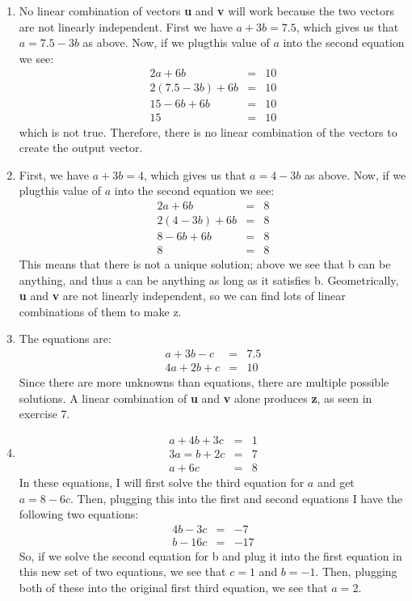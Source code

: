 \documentclass{article}
\begin{document}
\begin{enumerate}
	\item No linear combination of vectors \textbf{u} and \textbf{v} will work because the two vectors are not linearly independent. First we have $a +3b =7.5$, which gives us that $a = 7.5-3b$ as above. Now, if we plugthis value of $a$ into the second equation we see:
	\begin{eqnarray*}
		2a+6b&=&10\\
		2(7.5-3b)+6b &=&10\\
		15-6b+6b &=& 10\\
		15 &=& 10
	\end{eqnarray*}
	which is not true. Therefore, there is no linear combination of the vectors to create the output vector. 
	
	\item First, we have $a +3b =4$, which gives us that $a = 4-3b$ as above. Now, if we plugthis value of $a$ into the second equation we see:
	\begin{eqnarray*}
		2a+6b&=&8\\
		2(4-3b) + 6b &=& 8\\
		8-6b+6b &=& 8\\
		8&=&8
	\end{eqnarray*}
	This means that there is not a unique solution; above we see that b can be anything, and thus a can be anything as long as it satisfies b. Geometrically, \textbf{u} and \textbf{v} are not linearly independent, so we can find lots of linear combinations of them to make z.
	
	\item The equations are:
	\begin{eqnarray*}
		a+3b-c &=& 7.5\\
		4a+2b+c &=&10
	\end{eqnarray*}
	Since there are more unknowns than equations, there are multiple possible solutions. A linear combination of \textbf{u} and \textbf{v} alone produces \textbf{z}, as seen in exercise 7.
	
	\item 
	\begin{eqnarray*}
		a + 4b + 3c &=& 1\\
		3a = b + 2c &=& 7\\
		a+6c &=& 8
	\end{eqnarray*}
	In these equations, I will first solve the third equation for $a$ and get $a = 8-6c$. Then, plugging this into the first and second equations I have the following two equations:
	\begin{eqnarray*}
		4b-3c &=& -7\\
		b-16c &=& -17
	\end{eqnarray*}
	So, if we solve the second equation for b and plug it into the first equation in this new set of two equations, we see that $c=1$ and $b=-1$. Then, plugging both of these into the original first third equation, we see that $a=2$. 
	

\end{enumerate}
\end{document}
